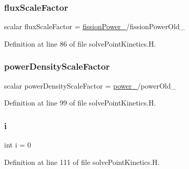 \subsubsection{\texorpdfstring{flux\+Scale\+Factor}{fluxScaleFactor}}
{\footnotesize\ttfamily scalar flux\+Scale\+Factor = \hyperlink{solvePointKinetics_8H_ae90376858fe578cbd789d06492f68a97}{fission\+Power\+\_\+}/fission\+Power\+Old\+\_\+}



Definition at line 86 of file solve\+Point\+Kinetics.\+H.

\mbox{\label{solvePointKinetics_8H_ae3d82145363877a2f67d7e1f9d7c5b48}} 
\subsubsection{\texorpdfstring{power\+Density\+Scale\+Factor}{powerDensityScaleFactor}}
{\footnotesize\ttfamily scalar power\+Density\+Scale\+Factor = \hyperlink{solvePointKineticsLiquidFuel_8H_a6db349ac2f1ddec3951d396b751c02a6}{power\+\_\+}/power\+Old\+\_\+}



Definition at line 99 of file solve\+Point\+Kinetics.\+H.

\mbox{\label{solvePointKinetics_8H_acb559820d9ca11295b4500f179ef6392}} 
\subsubsection{\texorpdfstring{i}{i}}
{\footnotesize\ttfamily int i = 0}



Definition at line 111 of file solve\+Point\+Kinetics.\+H.



